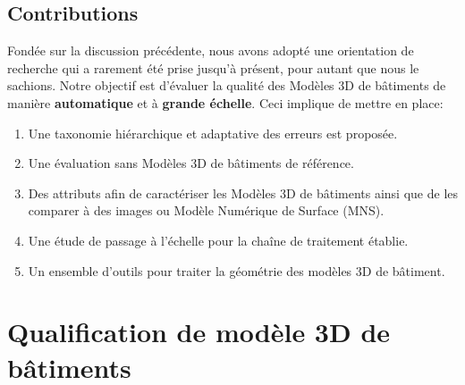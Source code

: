     \subsection*{Contributions}
        Fondée sur la discussion précédente, nous avons adopté une orientation de recherche qui a rarement été prise jusqu'à présent, pour autant que nous le sachions.
        Notre objectif est d'évaluer la qualité des Modèles 3D de bâtiments de manière \textbf{automatique} et à \textbf{grande échelle}.
        Ceci implique de mettre en place:

        \begin{enumerate}
            \item Une taxonomie hiérarchique et adaptative des erreurs est proposée.
            \item Une évaluation sans Modèles 3D de bâtiments de référence.
            \item Des attributs afin de caractériser les Modèles 3D de bâtiments ainsi que de les comparer à des images ou Modèle Numérique de Surface (MNS).
            \item Une étude de passage à l'échelle pour la chaîne de traitement établie.
            \item Un ensemble d'outils pour traiter la géométrie des modèles 3D de bâtiment.
        \end{enumerate}

\section*{Qualification de modèle 3D de bâtiments}

